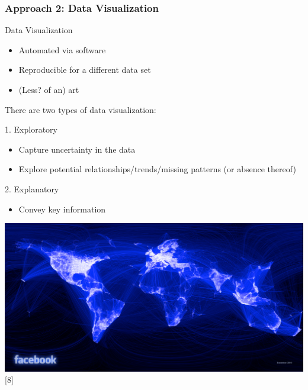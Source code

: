 \begin{frame}[allowframebreaks]
	\frametitle{Approach 2: Data Visualization}
  		\begin{block}{Data Visualization} 
			\begin{itemize}
				\item Automated via software
				\item Reproducible for a different data set
				\item (Less? of an) art
			\end{itemize}
		\end{block}
		There are two types of data visualization:
			\begin{block}{1. Exploratory} 
					\begin{itemize}
						\item \small Capture uncertainty in the data
						\item Explore potential relationships/trends/missing patterns (or absence thereof)
					\end{itemize}
			\end{block}
			\begin{block}{2. Explanatory}
					\begin{itemize}
						\item Convey key information \normalfont
					\end{itemize}
			\end{block}

   \begin{center}
     \includegraphics[scale=0.09]{images/facebook}[8]
    \end{center}

\end{frame}

